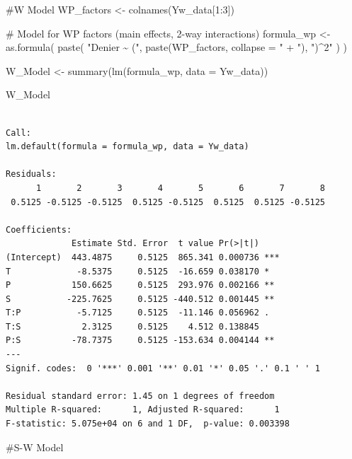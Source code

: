 \documentclass[
  letterpaper,
  DIV=11,
  numbers=noendperiod]{scrartcl}
\newenvironment{Shaded}{\begin{snugshade}}{\end{snugshade}}
\newcommand{\AttributeTok}[1]{\textcolor[rgb]{0.40,0.45,0.13}{#1}}
\newcommand{\CommentTok}[1]{\textcolor[rgb]{0.37,0.37,0.37}{#1}}
\newcommand{\DecValTok}[1]{\textcolor[rgb]{0.68,0.00,0.00}{#1}}
\newcommand{\FunctionTok}[1]{\textcolor[rgb]{0.28,0.35,0.67}{#1}}
\newcommand{\NormalTok}[1]{\textcolor[rgb]{0.00,0.23,0.31}{#1}}
\newcommand{\OtherTok}[1]{\textcolor[rgb]{0.00,0.23,0.31}{#1}}
\newcommand{\SpecialCharTok}[1]{\textcolor[rgb]{0.37,0.37,0.37}{#1}}
\newcommand{\StringTok}[1]{\textcolor[rgb]{0.13,0.47,0.30}{#1}}
\begin{document}
\begin{Shaded}
\begin{Highlighting}[]
\CommentTok{\#W Model}
\NormalTok{WP\_factors }\OtherTok{\textless{}{-}} \FunctionTok{colnames}\NormalTok{(Yw\_data[}\DecValTok{1}\SpecialCharTok{:}\DecValTok{3}\NormalTok{])}

\CommentTok{\# Model for WP factors (main effects, 2{-}way interactions)}
\NormalTok{formula\_wp }\OtherTok{\textless{}{-}} \FunctionTok{as.formula}\NormalTok{(}
  \FunctionTok{paste}\NormalTok{(}
    \StringTok{"Denier \textasciitilde{} ("}\NormalTok{,}
    \FunctionTok{paste}\NormalTok{(WP\_factors, }\AttributeTok{collapse =} \StringTok{" + "}\NormalTok{),}
    \StringTok{")\^{}2"}
\NormalTok{  )}
\NormalTok{)}

\NormalTok{W\_Model }\OtherTok{\textless{}{-}} \FunctionTok{summary}\NormalTok{(}\FunctionTok{lm}\NormalTok{(formula\_wp, }\AttributeTok{data =}\NormalTok{ Yw\_data))}

\NormalTok{W\_Model}
\end{Highlighting}
\end{Shaded}

\begin{verbatim}

Call:
lm.default(formula = formula_wp, data = Yw_data)

Residuals:
      1       2       3       4       5       6       7       8 
 0.5125 -0.5125 -0.5125  0.5125 -0.5125  0.5125  0.5125 -0.5125 

Coefficients:
             Estimate Std. Error  t value Pr(>|t|)    
(Intercept)  443.4875     0.5125  865.341 0.000736 ***
T             -8.5375     0.5125  -16.659 0.038170 *  
P            150.6625     0.5125  293.976 0.002166 ** 
S           -225.7625     0.5125 -440.512 0.001445 ** 
T:P           -5.7125     0.5125  -11.146 0.056962 .  
T:S            2.3125     0.5125    4.512 0.138845    
P:S          -78.7375     0.5125 -153.634 0.004144 ** 
---
Signif. codes:  0 '***' 0.001 '**' 0.01 '*' 0.05 '.' 0.1 ' ' 1

Residual standard error: 1.45 on 1 degrees of freedom
Multiple R-squared:      1, Adjusted R-squared:      1 
F-statistic: 5.075e+04 on 6 and 1 DF,  p-value: 0.003398
\end{verbatim}

\begin{Shaded}
\begin{Highlighting}[]
\CommentTok{\#S{-}W Model}
\end{Highlighting}
\end{Shaded}
\end{document}
